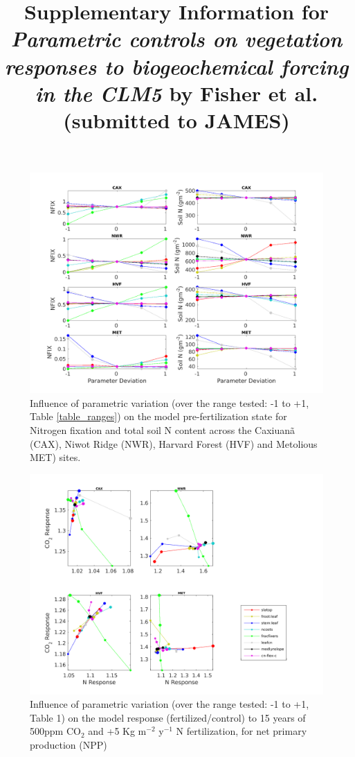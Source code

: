 \documentclass[draft,linenumbers]{agujournal}
\begin{document}
\title{Supplementary Information for \emph{Parametric controls on vegetation responses to biogeochemical forcing in the CLM5} by Fisher et al. (submitted to JAMES)}

    \begin{figure}[h]
     \centering
     \includegraphics[width=1.0\textwidth, left]{matlab/figures/MAY19jp_MEANCOND_-r200_2013TOTSOMN.png}
     \caption{Influence of parametric variation   (over the range tested: -1 to +1, Table \ref{table_ranges}) on the model pre-fertilization state for Nitrogen fixation and total soil N content across the Caxiuan\~a (CAX), Niwot Ridge (NWR), Harvard Forest (HVF) and Metolious MET) sites.}
     \label{MEANSOM}
\end{figure}
  
\begin{figure}[h]
     \includegraphics[width=1.2\textwidth]{matlab/figures/MAY19jp_at_relCNdep_defpft_TOTVEGC_y2013.png}
     \caption{Influence of parametric variation (over the range tested: -1 to +1, Table 1) on the model response (fertilized/control) to 15 years of 500ppm CO$_{2}$ and +5 Kg m$^{-2}$ y$^{-1}$ N fertilization, for net primary production (NPP)}
     \label{CN_NPP}
  \end{figure}
  
\end{document}
